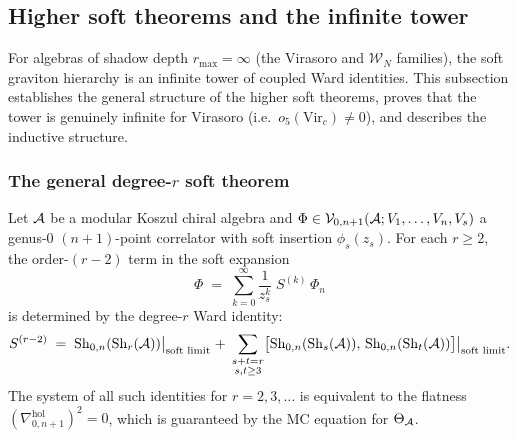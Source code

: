 %
%

\subsection{Higher soft theorems and the infinite tower}
\label{subsec:thqg-VI-higher-soft}

For algebras of shadow depth $r_{\max} = \infty$ (the Virasoro and
$\mathcal{W}_N$ families), the soft graviton hierarchy is an
infinite tower of coupled Ward identities. This subsection
establishes the general structure of the higher soft theorems,
proves that the tower is genuinely infinite for Virasoro
(i.e.\ $o_5(\mathrm{Vir}_c) \neq 0$), and describes the
inductive structure.

\subsubsection{The general degree-$r$ soft theorem}

\begin{theorem}
\label{thm:thqg-VI-general-soft}
Let $\mathcal{A}$ be a modular Koszul chiral algebra and
$\Phi \in \mathcal{V}_{0,n+1}(\mathcal{A}; V_1, \dotsc, V_n, V_s)$ a genus-$0$
$(n+1)$-point correlator with soft insertion $\phi_s(z_s)$.
For each $r \geq 2$, the order-$(r-2)$ term in the soft expansion
\begin{equation}\label{eq:thqg-VI-general-soft-expansion}
\Phi
\;=\;
\sum_{k=0}^{\infty}
\frac{1}{z_s^k}\;S^{(k)}\,\Phi_n
\end{equation}
is determined by the degree-$r$ Ward identity:
\begin{equation}\label{eq:thqg-VI-general-soft-factor}
S^{(r-2)}
\;=\;
\operatorname{Sh}_{0,n}(\operatorname{Sh}_r(\mathcal{A}))\bigl|_{\text{soft limit}}
\;+\;
\sum_{\substack{s+t=r \\ s,t \geq 3}}
\bigl[\operatorname{Sh}_{0,n}(\operatorname{Sh}_s(\mathcal{A})),\,
\operatorname{Sh}_{0,n}(\operatorname{Sh}_t(\mathcal{A}))\bigr]\bigl|_{\text{soft limit}}.
\end{equation}
The system of all such identities for $r = 2, 3, \dotsc$ is
equivalent to the flatness
$(\nabla^{\mathrm{hol}}_{0,n+1})^2 = 0$,
which is guaranteed by the MC equation for $\Theta_{\mathcal{A}}$.
\end{theorem}


